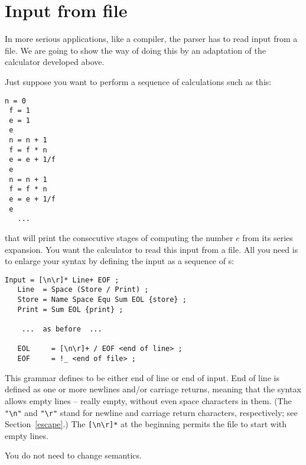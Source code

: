\newpage

\section{Input from file\label{file}}


In more serious applications, like a compiler, the parser has to read 
input from a file.
We are going to show the way of doing this by an adaptation
of the calculator developed above.

Just suppose you want to perform a sequence of calculations such as this:

\small
\begin{Verbatim}[samepage=true,xleftmargin=15mm,baselinestretch=0.8]
 n = 0  
 f = 1
 e = 1
 e
 n = n + 1 
 f = f * n
 e = e + 1/f  
 e
 n = n + 1 
 f = f * n
 e = e + 1/f  
 e
   ...
\end{Verbatim}
\normalsize

that will print the consecutive stages of computing the number $e$
from its series expansion.
You want the calculator to read this input from a file.
All you need is to enlarge your syntax by defining the input
as a sequence of s:

\small
\begin{Verbatim}[frame=single,framesep=2mm,samepage=true,xleftmargin=15mm,xrightmargin=15mm,baselinestretch=0.8]
   Input = [\n\r]* Line+ EOF ;
   Line  = Space (Store / Print) ;
   Store = Name Space Equ Sum EOL {store} ;
   Print = Sum EOL {print} ;

    ...  as before  ...   

   EOL     = [\n\r]+ / EOF <end of line> ;
   EOF     = !_ <end of file> ;
\end{Verbatim}
\normalsize

This grammar defines  to be either end of line
or end of input.
End of line is defined as one or more newlines and/or carriage returns,
meaning that the syntax allows empty lines -- really empty, without
even space characters in them.
(The \verb#"\n"# and \verb#"\r"# stand for newline and carriage
return characters, respectively; see Section~\ref{escape}.)
The \verb#[\n\r]*# at the beginning permits the file to start with empty lines.

You do not need to change semantics.

